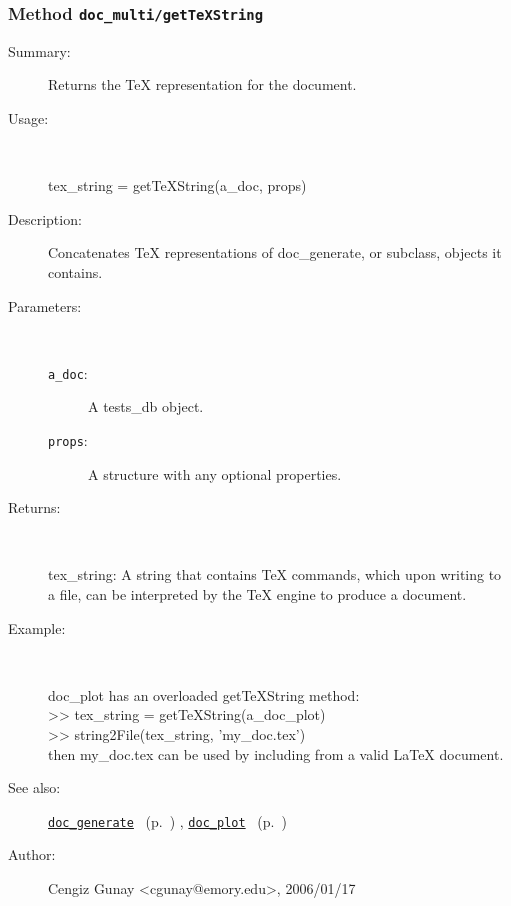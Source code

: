 \subsubsection[Method \texttt{getTeXString}]{Method \texttt{doc\_multi/getTeXString}}%
%
\label{ref_doc_multi__getTeXString}%
\hypertarget{ref_doc_multi__getTeXString}{}%
\begin{description}
\item[Summary:]Returns the TeX representation for the document.
%
\item[Usage:]~%
\begin{lyxcode}%
tex\_string = getTeXString(a\_doc, props)
%
\end{lyxcode}%
%
\item[Description:]%
Concatenates TeX representations of doc\_generate, or subclass, objects it contains.
\item[Parameters:]~
\begin{description}%
\item[\texttt{a\_doc}:]
 A tests\_db object.
\item[\texttt{props}:]
 A structure with any optional properties.
\end{description}%
%
\item[Returns:]~

	tex\_string: A string that contains TeX commands, which upon writing to a file,
	  can be interpreted by the TeX engine to produce a document.
%
\item[Example:]~
\begin{lyxcode}        doc\_plot has an overloaded getTeXString method:\\%
        >> tex\_string = getTeXString(a\_doc\_plot)\\%
        >> string2File(tex\_string, 'my\_doc.tex')\\%
        then my\_doc.tex can be used by including from a valid LaTeX document.\\%
\end{lyxcode}
%
\item[See also:]%
\hyperlink{ref_doc_generate}{\texttt{doc\_generate}}%
\ (p.~\pageref{ref_doc_generate})%
%
, \hyperlink{ref_doc_plot}{\texttt{doc\_plot}}%
\ (p.~\pageref{ref_doc_plot})%
%
%
\item[Author:]%
Cengiz Gunay <cgunay@emory.edu>, 2006/01/17%
\end{description}
\methodline%
